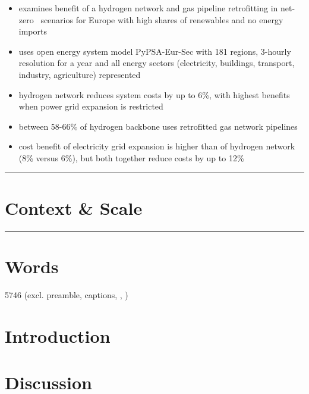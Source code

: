 \documentclass[12pt,preprint]{elsarticle}
\newcommand{\co}{\ce{CO2}~}
\begin{document}
\begin{itemize}
	\item examines benefit of a hydrogen network and gas pipeline retrofitting in net-zero \co scenarios for Europe with high shares of renewables and no energy imports
	\item uses open energy system model PyPSA-Eur-Sec with 181 regions, 3-hourly resolution for a year and all energy sectors (electricity, buildings, transport, industry, agriculture) represented
	\item hydrogen network reduces system costs by up to 6\%, with highest benefits when power grid expansion is restricted
	\item between 58-66\% of hydrogen backbone uses retrofitted gas network pipelines
	\item cost benefit of electricity grid expansion is higher than of hydrogen network (8\% versus 6\%), but both together reduce costs by up to 12\%
\end{itemize}

\par\noindent\rule{\textwidth}{0.4pt}

\section*{Context \& Scale}



\par\noindent\rule{\textwidth}{0.4pt}

\section*{Words}
5746 (excl. preamble, captions, , )

\newpage
\section*{Introduction}
\label{sec:intro}






\section*{Discussion}
\label{sec:discussion}
\end{document}
